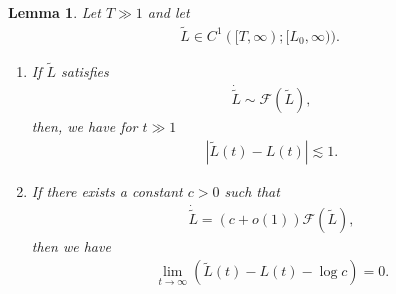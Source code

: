 \documentclass[10pt,a4paper]{amsart}
\newtheorem{lemma}[theorem]{Lemma}
\numberwithin{equation}{section}
\begin{document}
\begin{lemma}\label{mathcalFyouode}
Let $T\gg 1$ and let
\begin{align*}
\tilde{L}\in C^1([T,\infty);[L_0,\infty)).
\end{align*}

\begin{enumerate}
\item If $\tilde{L}$ satisfies
\begin{align}\label{Ltildecomparable}
\dot{\tilde{L}}\sim\mathcal{F}(\tilde{L}),
\end{align}
then, we have for $t\gg 1$
\begin{align}\label{LtildeLookisaonaji}
\left|\tilde{L}(t)-L(t)\right|\lesssim1.
\end{align}
\item If there exists a constant $c>0$ such that 
\begin{align}\label{Ltildecass}
\dot{\tilde{L}}=\left(c+o(1)\right)\mathcal{F}(\tilde{L}),
\end{align}
then we have
\begin{align}\label{LtildeLsaga0}
\lim_{t\to\infty}\left(\tilde{L}(t)-L(t)-\log{c}\right)=0.
\end{align}
\end{enumerate}
\end{lemma}
\end{document}
